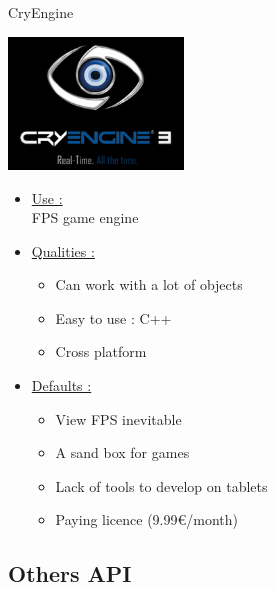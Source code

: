 \documentclass[a4paper,10pt]{beamer}
\begin{document}
			\begin{frame}{CryEngine}
				\begin{multicols}{2}
					\includegraphics[height=100pt]{images/logos/Cry_Engine.png}\\
					
					\columnbreak 
					
					\begin{itemize}
						\item \underline{Use :}\\		
						FPS game engine				
						\item \underline{Qualities :}\\
						\begin{itemize}
							\item Can work with a lot of objects
							\item Easy to use : C++
							\item Cross platform
						\end{itemize}
					\end{itemize}		 
				\end{multicols}
				\begin{itemize}
					\item \underline{Defaults :}\\
					\begin{itemize}
						\item View FPS inevitable
						\item A sand box for games
						\item Lack of tools to develop on tablets
						\item Paying licence (9.99\euro/month)
					\end{itemize}
				\end{itemize}
			\end{frame}
			
			
		\subsection{Others API}
		
\end{document}
